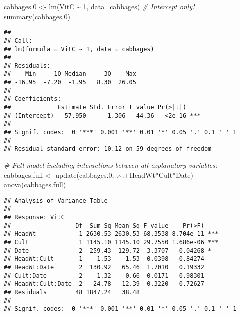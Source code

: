\documentclass[
]{article}
\newenvironment{Shaded}{\begin{snugshade}}{\end{snugshade}}
\newcommand{\AttributeTok}[1]{\textcolor[rgb]{0.77,0.63,0.00}{#1}}
\newcommand{\CommentTok}[1]{\textcolor[rgb]{0.56,0.35,0.01}{\textit{#1}}}
\newcommand{\DecValTok}[1]{\textcolor[rgb]{0.00,0.00,0.81}{#1}}
\newcommand{\FloatTok}[1]{\textcolor[rgb]{0.00,0.00,0.81}{#1}}
\newcommand{\FunctionTok}[1]{\textcolor[rgb]{0.00,0.00,0.00}{#1}}
\newcommand{\NormalTok}[1]{#1}
\newcommand{\OtherTok}[1]{\textcolor[rgb]{0.56,0.35,0.01}{#1}}
\newcommand{\SpecialCharTok}[1]{\textcolor[rgb]{0.00,0.00,0.00}{#1}}
\begin{document}
\begin{Shaded}
\begin{Highlighting}[]
\NormalTok{cabbages}\FloatTok{.0} \OtherTok{\textless{}{-}} \FunctionTok{lm}\NormalTok{(VitC }\SpecialCharTok{\textasciitilde{}} \DecValTok{1}\NormalTok{, }\AttributeTok{data=}\NormalTok{cabbages) }\CommentTok{\# Intercept only!}
\FunctionTok{summary}\NormalTok{(cabbages}\FloatTok{.0}\NormalTok{)         }
\end{Highlighting}
\end{Shaded}

\begin{verbatim}
## 
## Call:
## lm(formula = VitC ~ 1, data = cabbages)
## 
## Residuals:
##    Min     1Q Median     3Q    Max 
## -16.95  -7.20  -1.95   8.30  26.05 
## 
## Coefficients:
##             Estimate Std. Error t value Pr(>|t|)    
## (Intercept)   57.950      1.306   44.36   <2e-16 ***
## ---
## Signif. codes:  0 '***' 0.001 '**' 0.01 '*' 0.05 '.' 0.1 ' ' 1
## 
## Residual standard error: 10.12 on 59 degrees of freedom
\end{verbatim}

\begin{Shaded}
\begin{Highlighting}[]
\CommentTok{\# Full model including interactions between all explanatory variables:}
\NormalTok{cabbages.full }\OtherTok{\textless{}{-}} \FunctionTok{update}\NormalTok{(cabbages}\FloatTok{.0}\NormalTok{, .}\SpecialCharTok{\textasciitilde{}}\NormalTok{.}\SpecialCharTok{+}\NormalTok{HeadWt}\SpecialCharTok{*}\NormalTok{Cult}\SpecialCharTok{*}\NormalTok{Date)}
\FunctionTok{anova}\NormalTok{(cabbages.full)}
\end{Highlighting}
\end{Shaded}

\begin{verbatim}
## Analysis of Variance Table
## 
## Response: VitC
##                  Df  Sum Sq Mean Sq F value    Pr(>F)    
## HeadWt            1 2630.53 2630.53 68.3538 8.704e-11 ***
## Cult              1 1145.10 1145.10 29.7550 1.686e-06 ***
## Date              2  259.43  129.72  3.3707   0.04268 *  
## HeadWt:Cult       1    1.53    1.53  0.0398   0.84274    
## HeadWt:Date       2  130.92   65.46  1.7010   0.19332    
## Cult:Date         2    1.32    0.66  0.0171   0.98301    
## HeadWt:Cult:Date  2   24.78   12.39  0.3220   0.72627    
## Residuals        48 1847.24   38.48                      
## ---
## Signif. codes:  0 '***' 0.001 '**' 0.01 '*' 0.05 '.' 0.1 ' ' 1
\end{verbatim}
\end{document}
